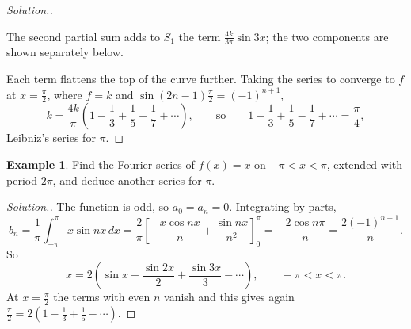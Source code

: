 \documentclass[11pt,a4paper]{article}
\theoremstyle{definition}
\newtheorem{exa}[thm]{Example}
\newenvironment{solution}
  {\renewcommand{\qedsymbol}{}\begin{proof}[\textit{Solution}.]}
  {\end{proof}}
\begin{document}
\begin{solution}
\begin{figure}[H]
\centering
{}
\end{figure}

\begin{figure}[H]
\centering
{}
\end{figure}

The second partial sum adds to $S_1$ the term $\frac{4k}{3\pi}\sin 3x$; the two
components are shown separately below.

\begin{figure}[H]
\centering
{}
\end{figure}

Each term flattens the top of the curve further. Taking the series to converge to
$f$ at $x = \frac{\pi}{2}$, where $f = k$ and $\sin(2n - 1)\frac{\pi}{2} =
(-1)^{n+1}$,
\[k = \frac{4k}{\pi}\left( 1 - \frac{1}{3} + \frac{1}{5}- \frac{1}{7} +
\cdots\right),\qquad\text{so}\qquad 1 - \frac{1}{3} + \frac{1}{5}- \frac{1}{7} +
\cdots = \frac{\pi}{4},\]
Leibniz's series for $\pi$.
\end{solution}

\begin{exa}
\label{ex:sawtooth}
Find the Fourier series of $f(x) = x$ on $-\pi<x<\pi$, extended with period
$2\pi$, and deduce another series for $\pi$.
\end{exa}

\begin{solution}
The function is odd, so $a_0 = a_n = 0$. Integrating by parts,
\[b_n = \frac{1}{\pi}\int_{-\pi}^{\pi}x\sin nx\,dx =
\frac2\pi\left[-\frac{x\cos nx}{n} + \frac{\sin nx}{n^2}\right]_0^\pi =
-\frac{2\cos n\pi}{n} = \frac{2(-1)^{n+1}}{n} .\]
So
\[x = 2\left(\sin x - \frac{\sin 2x}{2} + \frac{\sin 3x}{3} - \cdots\right),\qquad
-\pi<x<\pi .\]
At $x = \frac{\pi}{2}$ the terms with even $n$ vanish and this gives again
$\frac{\pi}{2} = 2\left(1 - \frac13 + \frac15 - \cdots\right)$.
\end{solution}
\end{document}
